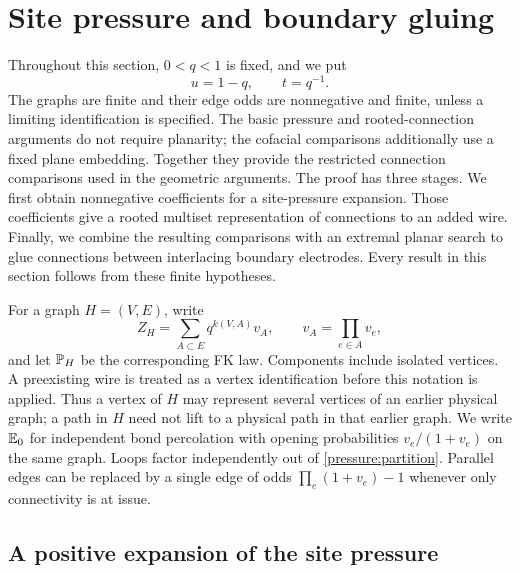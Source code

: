 \section{Site pressure and boundary gluing}
\label{sec:pressure}

Throughout this section, $0<q<1$ is fixed, and we put
\[
 u=1-q,\qquad t=q^{-1}.
\]
The graphs are finite and their edge odds are nonnegative and finite,
unless a limiting identification is specified. The basic pressure and
rooted-connection arguments do not require planarity; the cofacial
comparisons additionally use a fixed plane embedding. Together they
provide the restricted connection comparisons used in the geometric
arguments. The proof has three stages. We first obtain nonnegative
coefficients for a site-pressure expansion. Those coefficients give a
rooted multiset representation of connections to an added wire. Finally,
we combine the resulting comparisons with an extremal planar search to
glue connections between interlacing boundary electrodes.
Every result in this section follows from these finite hypotheses.

For a graph $H=(V,E)$, write
\begin{equation}
 Z_H=\sum_{A\subset E}q^{k(V,A)}v_A,
 \qquad v_A=\prod_{e\in A}v_e,
 \label{pressure:partition}
\end{equation}
and let $\mathbb P_H$ be the corresponding FK law. Components include isolated
vertices. A preexisting wire is treated as a vertex identification before
this notation is applied. Thus a vertex of $H$ may represent several
vertices of an earlier physical graph; a path in $H$ need not lift to a
physical path in that earlier graph. We write $\mathbb E_0$ for independent bond
percolation with opening probabilities $v_e/(1+v_e)$ on the same graph.
Loops factor independently out of \eqref{pressure:partition}. Parallel
edges can be replaced by a single edge of odds
$\prod_e(1+v_e)-1$ whenever only connectivity is at issue.

\subsection{A positive expansion of the site pressure}

